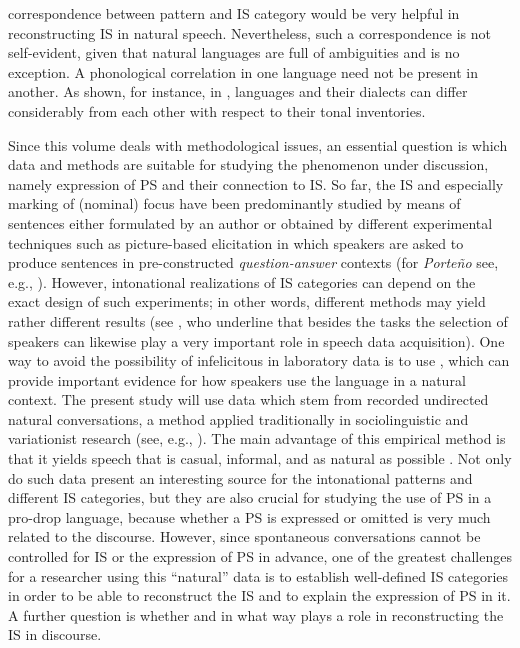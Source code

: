 \documentclass[output=paper]{langsci/langscibook}
\begin{document}
correspondence between  pattern and IS category would be very helpful in reconstructing IS in natural speech. Nevertheless, such a correspondence is not self-evident, given that natural languages are full of ambiguities and  is no exception. A phonological correlation in one language need not be present in another. As shown, for instance, in \citet{frotaPrieto2015},  languages and their dialects can differ considerably from each other with respect to their tonal inventories.\largerpage

Since this volume deals with methodological issues, an essential question is which data and methods are suitable for studying the phenomenon under discussion, namely expression of PS and their connection to IS. So far, the IS and especially marking of (nominal) focus have been predominantly studied by means of sentences either formulated by an author or obtained by different experimental techniques such as picture-based elicitation in which speakers are asked to produce sentences in pre-constructed \textit{question-answer} contexts (for \textit{Porte{\~n}o} see, e.g., \citealt{Gabriel2010article}). However, intonational realizations of IS categories can depend on the exact design of such experiments; in other words, different methods may yield rather different results (see \citealt{Niebuhr2015}, who underline that besides the tasks the selection of speakers can likewise play a very important role in speech data acquisition). One way to avoid the possibility of infelicitous  in laboratory data is to use , which can provide important evidence for how speakers use the language in a natural context. The present study will use  data which stem from recorded undirected natural conversations, a method applied traditionally in sociolinguistic and variationist research (see, e.g., \citealt{Labov1984,SilvaCorvalan.2001}). The main advantage of this empirical method is that it yields speech that is casual, informal, and as natural as possible \citep[52]{SilvaCorvalan.2001}. Not only do such data present an interesting source for the intonational patterns and different IS categories, but they are also crucial for studying the use of PS in a pro-drop language, because whether a PS is expressed or omitted is very much related to the discourse. However, since spontaneous conversations cannot be controlled for IS or the expression of PS in advance, one of the greatest challenges for a researcher using this ``natural'' data is to establish well-defined IS categories in order to be able to reconstruct the IS and to explain the expression of PS in it. A further question is whether and in what way  plays a role in reconstructing the IS in discourse.
\end{document}

